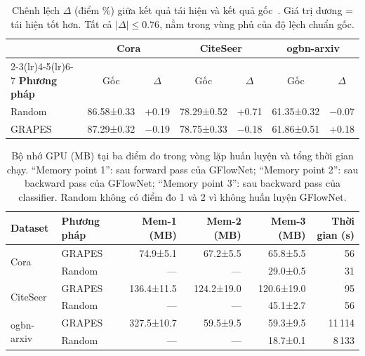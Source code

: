 \begin{table}[H]
\centering
\caption{Chênh lệch $\Delta$ (điểm \%) giữa kết quả tái hiện và kết quả gốc~\cite{Younesian2023GRAPES}. Giá trị dương = tái hiện tốt hơn. Tất cả $|\Delta| \leq 0.76$, nằm trong vùng phủ của độ lệch chuẩn gốc.}
\label{tab:reproduce_delta}
\small
\setlength{\tabcolsep}{8pt}
\begin{tabular}{l c c c c c c}
\toprule
 & \multicolumn{2}{c}{\textbf{Cora}} & \multicolumn{2}{c}{\textbf{CiteSeer}} & \multicolumn{2}{c}{\textbf{ogbn-arxiv}} \\
\cmidrule(lr){2-3}\cmidrule(lr){4-5}\cmidrule(lr){6-7}
\textbf{Phương pháp} & Gốc & $\Delta$ & Gốc & $\Delta$ & Gốc & $\Delta$ \\
\midrule
Random & 86.58±0.33 & +0.19 & 78.29±0.52 & +0.71 & 61.35±0.32 & $-$0.07 \\
GRAPES & 87.29±0.32 & $-$0.19 & 78.75±0.33 & $-$0.18 & 61.86±0.51 & +0.18 \\
\bottomrule
\end{tabular}
\end{table}

\begin{table}[H]
\centering
\caption{Bộ nhớ GPU (MB) tại ba điểm đo trong vòng lặp huấn luyện và tổng thời gian chạy. ``Memory point 1'': sau forward pass của GFlowNet; ``Memory point 2'': sau backward pass của GFlowNet; ``Memory point 3'': sau backward pass của classifier. Random không có điểm đo 1 và 2 vì không huấn luyện GFlowNet.}
\label{tab:reproduce_memory}
\small
\setlength{\tabcolsep}{5pt}
\begin{tabular}{l l r r r r}
\toprule
\textbf{Dataset} & \textbf{Phương pháp} & \textbf{Mem-1 (MB)} & \textbf{Mem-2 (MB)} & \textbf{Mem-3 (MB)} & \textbf{Thời gian (s)} \\
\midrule
\multirow{2}{*}{Cora}
  & GRAPES & 74.9±5.1 & 67.2±5.5 & 65.8±5.5 & 56 \\
  & Random & ---       & ---       & 29.0±0.5 & 31 \\
\midrule
\multirow{2}{*}{CiteSeer}
  & GRAPES & 136.4±11.5 & 124.2±19.0 & 120.6±19.0 & 95 \\
  & Random & ---         & ---         & 45.1±2.7   & 56 \\
\midrule
\multirow{2}{*}{ogbn-arxiv}
  & GRAPES & 327.5±10.7 & 59.5±9.5 & 59.3±9.5 & 11\,114 \\
  & Random & ---         & ---       & 18.7±0.1 & 8\,133  \\
\bottomrule
\end{tabular}
\end{table}

